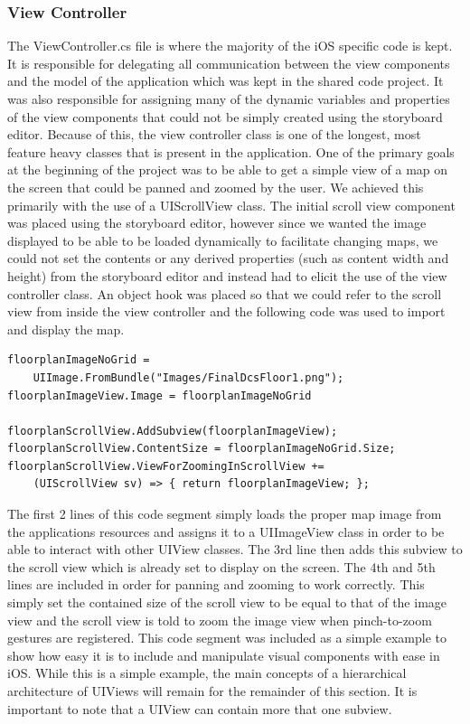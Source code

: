 \documentclass[12pt,a4paper]{report}
\begin{document}
\subsubsection{View Controller}
The ViewController.cs file is where the majority of the iOS specific code is kept. It is responsible for delegating all communication between the view components and the model of the application which was kept in the shared code project. It was also responsible for assigning many of the dynamic variables and properties of the view components that could not be simply created using the storyboard editor. Because of this, the view controller class is one of the longest, most feature heavy classes that is present in the application. One of the primary goals at the beginning of the project was to be able to get a simple view of a map on the screen that could be panned and zoomed by the user. We achieved this primarily with the use of a UIScrollView class. The initial scroll view component was placed using the storyboard editor, however since we wanted the image displayed to be able to be loaded dynamically to facilitate changing maps, we could not set the contents or any derived properties (such as content width and height) from the storyboard editor and instead had to elicit the use of the view controller class. An object hook was placed so that we could refer to the scroll view from inside the view controller and the following code was used to import and display the map.
\begin{lstlisting}
floorplanImageNoGrid = 
	UIImage.FromBundle("Images/FinalDcsFloor1.png");
floorplanImageView.Image = floorplanImageNoGrid

floorplanScrollView.AddSubview(floorplanImageView);
floorplanScrollView.ContentSize = floorplanImageNoGrid.Size;
floorplanScrollView.ViewForZoomingInScrollView += 
	(UIScrollView sv) => { return floorplanImageView; };
\end{lstlisting}
The first 2 lines of this code segment simply loads the proper map image from the applications resources and assigns it to a UIImageView class in order to be able to interact with other UIView classes. The 3rd line then adds this subview to the scroll view which is already set to display on the screen. The 4th and 5th lines are included in order for panning and zooming to work correctly. This simply set the contained size of the scroll view to be equal to that of the image view and the scroll view is told to zoom the image view when pinch-to-zoom gestures are registered. This code segment was included as a simple example to show how easy it is to include and manipulate visual components with ease in iOS. While this is a simple example, the main concepts of a hierarchical architecture of UIViews will remain for the remainder of this section. It is important to note that a UIView can contain more that one subview.
\end{document}
